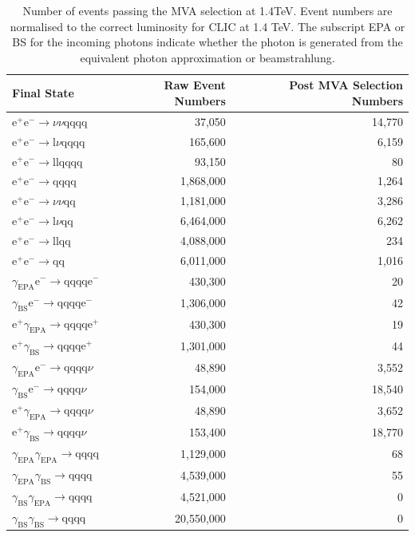 \begin{table}[h!]
\centering
\begin{tabular}{ l r r }
\hline
Final State & Raw Event Numbers & Post MVA Selection Numbers \\ 
\hline
$\text{e}^{+}\text{e}^{-} \rightarrow \nu{\nu}\text{qqqq}$ & 37,050 & 14,770 \\
$\text{e}^{+}\text{e}^{-} \rightarrow \text{l}\nu\text{qqqq}$ & 165,600 & 6,159 \\
$\text{e}^{+}\text{e}^{-} \rightarrow \text{llqqqq}$ & 93,150 & 80 \\
$\text{e}^{+}\text{e}^{-} \rightarrow \text{qqqq}$ & 1,868,000 & 1,264 \\
$\text{e}^{+}\text{e}^{-} \rightarrow \nu{\nu}\text{qq}$ & 1,181,000 & 3,286 \\
$\text{e}^{+}\text{e}^{-} \rightarrow \text{l}\nu\text{qq}$ & 6,464,000 & 6,262 \\
$\text{e}^{+}\text{e}^{-} \rightarrow \text{llqq}$ & 4,088,000 & 234 \\
$\text{e}^{+}\text{e}^{-} \rightarrow \text{qq}$ & 6,011,000 & 1,016 \\
$\gamma_{\text{EPA}}\text{e}^{-} \rightarrow \text{qqqq}\text{e}^{-}$ & 430,300 & 20 \\
$\gamma_{\text{BS}}\text{e}^{-} \rightarrow \text{qqqq}\text{e}^{-}$ & 1,306,000 & 42 \\
$\text{e}^{+}\gamma_{\text{EPA}} \rightarrow \text{qqqq}\text{e}^{+}$ & 430,300 & 19 \\
$\text{e}^{+}\gamma_{\text{BS}} \rightarrow \text{qqqq}\text{e}^{+}$ & 1,301,000 & 44 \\
$\gamma_{\text{EPA}}\text{e}^{-} \rightarrow \text{qqqq}\nu$ & 48,890 & 3,552 \\
$\gamma_{\text{BS}}\text{e}^{-} \rightarrow \text{qqqq}\nu$ & 154,000 & 18,540 \\
$\text{e}^{+}\gamma_{\text{EPA}} \rightarrow \text{qqqq}\nu$ & 48,890 & 3,652 \\
$\text{e}^{+}\gamma_{\text{BS}} \rightarrow \text{qqqq}\nu$ & 153,400 & 18,770 \\
$\gamma_{\text{EPA}}\gamma_{\text{EPA}} \rightarrow \text{qqqq}$ & 1,129,000 & 68 \\
$\gamma_{\text{EPA}}\gamma_{\text{BS}} \rightarrow \text{qqqq}$ & 4,539,000 & 55 \\
$\gamma_{\text{BS}}\gamma_{\text{EPA}} \rightarrow \text{qqqq}$ & 4,521,000 & 0 \\
$\gamma_{\text{BS}}\gamma_{\text{BS}} \rightarrow \text{qqqq}$ & 20,550,000 & 0 \\
\hline
\end{tabular}
\caption[Number of events passing the MVA selection at 1.4TeV.]{Number of events passing the MVA selection at 1.4TeV.  Event numbers are normalised to the correct luminosity for CLIC at 1.4 TeV.   The subscript EPA or BS for the incoming photons indicate whether the photon is generated from the equivalent photon approximation or beamstrahlung.}
\label{table:postmvanumbers1400GeV}
\end{table}

